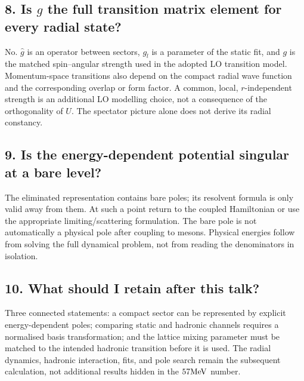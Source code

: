 \documentclass[11pt,a4paper]{article}
\begin{document}
\subsection*{8. Is $g$ the full transition matrix element for every radial state?}
No. $\hat g$ is an operator between sectors, $g_l$ is a parameter of
the static fit, and $g$ is the matched spin--angular strength used in
the adopted LO transition model. Momentum-space transitions also depend
on the compact radial wave function and the corresponding overlap or
form factor. A common, local, $r$-independent strength is an additional
LO modelling choice, not a consequence of the orthogonality of $U$.
The spectator picture alone does not derive its radial constancy.

\subsection*{9. Is the energy-dependent potential singular at a bare level?}
The eliminated representation contains bare poles; its resolvent formula
is only valid away from them. At such a point return to the coupled
Hamiltonian or use the appropriate limiting/scattering formulation.
The bare pole is not automatically a physical pole after coupling to
mesons. Physical energies follow from solving the full dynamical problem,
not from reading the denominators in isolation.

\subsection*{10. What should I retain after this talk?}
Three connected statements: a compact sector can be represented by
explicit energy-dependent poles; comparing static and hadronic channels
requires a normalised basis transformation; and the lattice mixing
parameter must be matched to the intended hadronic transition before
it is used. The radial dynamics, hadronic interaction, fits, and pole
search remain the subsequent calculation, not additional results hidden
in the $57\mathrm{MeV}$ number.

\clearpage
{}
\end{document}
